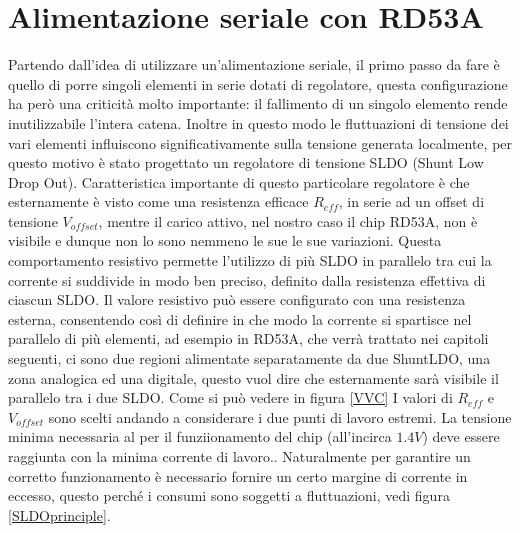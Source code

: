 \section{Alimentazione seriale con RD53A}
Partendo dall'idea di utilizzare un'alimentazione seriale, il primo passo da fare è quello di porre singoli elementi in serie dotati di regolatore, questa configurazione ha però una criticità molto importante: il fallimento di un singolo elemento rende inutilizzabile l'intera catena.
Inoltre in questo modo le fluttuazioni di tensione dei vari elementi influiscono significativamente  sulla tensione generata localmente, per questo motivo è stato progettato un regolatore di tensione SLDO (Shunt Low Drop Out). 
% 
Caratteristica importante di questo particolare regolatore è che esternamente è visto come una resistenza efficace $R_{eff}$, in serie ad un offset di tensione $V_{offset}$, mentre il carico attivo, nel nostro caso il chip RD53A, non è visibile e dunque non lo sono nemmeno le sue le sue variazioni. 
Questa comportamento resistivo permette l'utilizzo di più SLDO in parallelo tra cui la corrente si suddivide in modo ben preciso, definito dalla resistenza effettiva di ciascun SLDO. 
Il valore resistivo può essere configurato con una resistenza esterna, consentendo così di definire in che modo la corrente si spartisce nel parallelo di più elementi, ad esempio in RD53A, che verrà trattato nei capitoli seguenti, ci sono due regioni alimentate separatamente da due ShuntLDO, una zona analogica ed una digitale, questo vuol dire che esternamente sarà visibile il parallelo tra i due SLDO. 
Come si può vedere in figura \ref{VVC} I valori di $R_{eff}$ e $V_{offset}$ sono scelti andando a considerare i due punti di lavoro estremi. La tensione minima necessaria al per il funziionamento del chip (all'incirca $1.4V$) deve essere raggiunta con la minima corrente di lavoro.. Naturalmente per garantire un corretto funzionamento è necessario fornire un certo margine di corrente in eccesso, questo perché i consumi sono soggetti a fluttuazioni, vedi figura \ref{SLDOprinciple}. 
